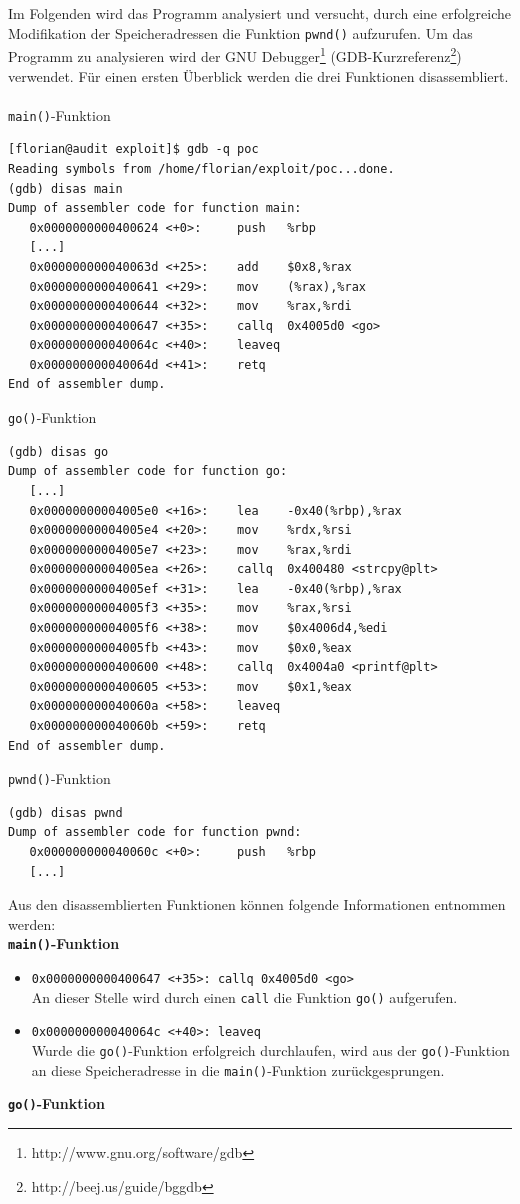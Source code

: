 Im Folgenden wird das Programm analysiert und versucht, durch eine erfolgreiche Modifikation der Speicheradressen die Funktion \texttt{pwnd()} aufzurufen.
Um das Programm zu analysieren wird der GNU Debugger\footnote{http://www.gnu.org/software/gdb} (GDB-Kurzreferenz\footnote{http://beej.us/guide/bggdb}) verwendet. Für einen ersten Überblick werden die drei Funktionen disassembliert.
\\
\\
\texttt{main()}-Funktion
\begin{lstlisting}[basicstyle=\ttfamily\footnotesize]
[florian@audit exploit]$ gdb -q poc
Reading symbols from /home/florian/exploit/poc...done.
(gdb) disas main
Dump of assembler code for function main:
   0x0000000000400624 <+0>:     push   %rbp
   [...]
   0x000000000040063d <+25>:    add    $0x8,%rax
   0x0000000000400641 <+29>:    mov    (%rax),%rax
   0x0000000000400644 <+32>:    mov    %rax,%rdi
   0x0000000000400647 <+35>:    callq  0x4005d0 <go>
   0x000000000040064c <+40>:    leaveq
   0x000000000040064d <+41>:    retq
End of assembler dump.
\end{lstlisting}
\texttt{go()}-Funktion
\begin{lstlisting}[basicstyle=\ttfamily\footnotesize]
(gdb) disas go
Dump of assembler code for function go:
   [...]
   0x00000000004005e0 <+16>:    lea    -0x40(%rbp),%rax
   0x00000000004005e4 <+20>:    mov    %rdx,%rsi
   0x00000000004005e7 <+23>:    mov    %rax,%rdi
   0x00000000004005ea <+26>:    callq  0x400480 <strcpy@plt>
   0x00000000004005ef <+31>:    lea    -0x40(%rbp),%rax
   0x00000000004005f3 <+35>:    mov    %rax,%rsi
   0x00000000004005f6 <+38>:    mov    $0x4006d4,%edi
   0x00000000004005fb <+43>:    mov    $0x0,%eax
   0x0000000000400600 <+48>:    callq  0x4004a0 <printf@plt>
   0x0000000000400605 <+53>:    mov    $0x1,%eax
   0x000000000040060a <+58>:    leaveq
   0x000000000040060b <+59>:    retq
End of assembler dump.
\end{lstlisting}
\texttt{pwnd()}-Funktion
\begin{lstlisting}[basicstyle=\ttfamily\footnotesize]
(gdb) disas pwnd
Dump of assembler code for function pwnd:
   0x000000000040060c <+0>:     push   %rbp
   [...]
\end{lstlisting}
\par\medskip 
Aus den disassemblierten Funktionen können folgende Informationen entnommen werden:
\\
\textbf{\texttt{main()}-Funktion}

\begin{itemize}
      \item \texttt{0x0000000000400647 <+35>:    callq  0x4005d0 <go>}\\
        An dieser Stelle wird durch einen \texttt{call} die Funktion \texttt{go()} aufgerufen.
      \item \texttt{0x000000000040064c <+40>:    leaveq}\\
        Wurde die \texttt{go()}-Funktion erfolgreich durchlaufen, wird aus der \texttt{go()}-Funktion an diese Speicheradresse in die \texttt{main()}-Funktion zurückgesprungen.       
\end{itemize}
\textbf{\texttt{go()}-Funktion}

